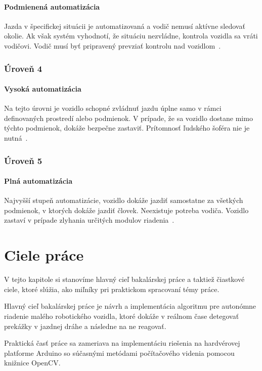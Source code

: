 \paragraph{Podmienená automatizácia}Jazda v špecifickej situácii je automatizovaná a vodič nemusí aktívne sledovať okolie. Ak však systém vyhodnotí, že situáciu nezvládne, kontrola vozidla sa vráti vodičovi. Vodič musí byť pripravený prevziať kontrolu nad vozidlom~\cite{saej3016}.
\subsubsection{Úroveň 4}
\paragraph{Vysoká automatizácia}Na tejto úrovni je vozidlo schopné zvládnuť jazdu úplne samo v rámci definovaných prostredí alebo podmienok. V prípade, že sa vozidlo dostane mimo týchto podmienok, dokáže bezpečne zastaviť. Prítomnosť ľudského šoféra nie je nutná~\cite{saej3016}.
\subsubsection{Úroveň 5}
\paragraph{Plná automatizácia}Najvyšší stupeň automatizácie, vozidlo dokáže jazdiť samostatne za všetkých podmienok, v ktorých dokáže jazdiť človek. Neexistuje potreba vodiča. Vozidlo zastaví v prípade zlyhania určitých modulov riadenia~\cite{saej3016}.

\section{Ciele práce}\label{sec:CielePrace}
V tejto kapitole si stanovíme hlavný cieľ bakalárskej práce a taktiež čiastkové ciele, ktoré slúžia, ako miľníky pri praktickom spracovaní témy práce.\par
Hlavný cieľ bakalárskej práce je návrh a implementácia algoritmu pre autonómne riadenie malého robotického vozidla, ktoré dokáže v reálnom čase detegovať prekážky v jazdnej dráhe a následne na ne reagovať.\par
Praktická časť práce sa zameriava na implementáciu riešenia na hardvérovej platforme Arduino so súčasnými metódami počítačového videnia pomocou knižnice OpenCV.\par
